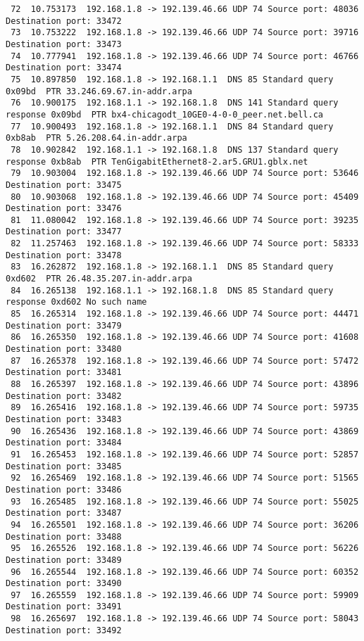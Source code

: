 \documentclass[a4paper]{report} %
\begin{document}
\begin{lstlisting}
 72  10.753173  192.168.1.8 -> 192.139.46.66 UDP 74 Source port: 48036  Destination port: 33472
 73  10.753222  192.168.1.8 -> 192.139.46.66 UDP 74 Source port: 39716  Destination port: 33473
 74  10.777941  192.168.1.8 -> 192.139.46.66 UDP 74 Source port: 46766  Destination port: 33474
 75  10.897850  192.168.1.8 -> 192.168.1.1  DNS 85 Standard query 0x09bd  PTR 33.246.69.67.in-addr.arpa
 76  10.900175  192.168.1.1 -> 192.168.1.8  DNS 141 Standard query response 0x09bd  PTR bx4-chicagodt_10GE0-4-0-0_peer.net.bell.ca
 77  10.900493  192.168.1.8 -> 192.168.1.1  DNS 84 Standard query 0xb8ab  PTR 5.26.208.64.in-addr.arpa
 78  10.902842  192.168.1.1 -> 192.168.1.8  DNS 137 Standard query response 0xb8ab  PTR TenGigabitEthernet8-2.ar5.GRU1.gblx.net
 79  10.903004  192.168.1.8 -> 192.139.46.66 UDP 74 Source port: 53646  Destination port: 33475
 80  10.903068  192.168.1.8 -> 192.139.46.66 UDP 74 Source port: 45409  Destination port: 33476
 81  11.080042  192.168.1.8 -> 192.139.46.66 UDP 74 Source port: 39235  Destination port: 33477
 82  11.257463  192.168.1.8 -> 192.139.46.66 UDP 74 Source port: 58333  Destination port: 33478
 83  16.262872  192.168.1.8 -> 192.168.1.1  DNS 85 Standard query 0xd602  PTR 26.48.35.207.in-addr.arpa
 84  16.265138  192.168.1.1 -> 192.168.1.8  DNS 85 Standard query response 0xd602 No such name
 85  16.265314  192.168.1.8 -> 192.139.46.66 UDP 74 Source port: 44471  Destination port: 33479
 86  16.265350  192.168.1.8 -> 192.139.46.66 UDP 74 Source port: 41608  Destination port: 33480
 87  16.265378  192.168.1.8 -> 192.139.46.66 UDP 74 Source port: 57472  Destination port: 33481
 88  16.265397  192.168.1.8 -> 192.139.46.66 UDP 74 Source port: 43896  Destination port: 33482
 89  16.265416  192.168.1.8 -> 192.139.46.66 UDP 74 Source port: 59735  Destination port: 33483
 90  16.265436  192.168.1.8 -> 192.139.46.66 UDP 74 Source port: 43869  Destination port: 33484
 91  16.265453  192.168.1.8 -> 192.139.46.66 UDP 74 Source port: 52857  Destination port: 33485
 92  16.265469  192.168.1.8 -> 192.139.46.66 UDP 74 Source port: 51565  Destination port: 33486
 93  16.265485  192.168.1.8 -> 192.139.46.66 UDP 74 Source port: 55025  Destination port: 33487
 94  16.265501  192.168.1.8 -> 192.139.46.66 UDP 74 Source port: 36206  Destination port: 33488
 95  16.265526  192.168.1.8 -> 192.139.46.66 UDP 74 Source port: 56226  Destination port: 33489
 96  16.265544  192.168.1.8 -> 192.139.46.66 UDP 74 Source port: 60352  Destination port: 33490
 97  16.265559  192.168.1.8 -> 192.139.46.66 UDP 74 Source port: 59909  Destination port: 33491
 98  16.265697  192.168.1.8 -> 192.139.46.66 UDP 74 Source port: 58043  Destination port: 33492

\end{lstlisting}
\end{document}
